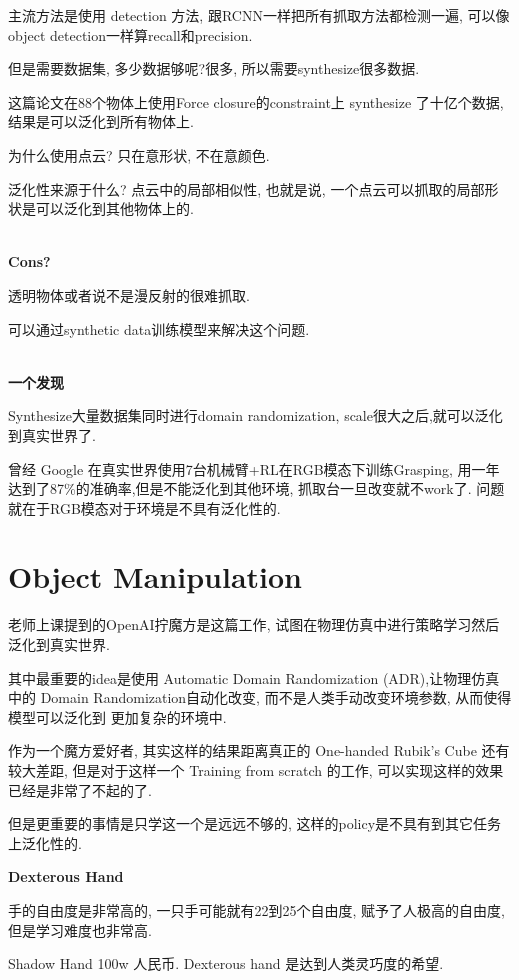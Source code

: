主流方法是使用 detection 方法, 跟RCNN一样把所有抓取方法都检测一遍, 
可以像object detection一样算recall和precision.

但是需要数据集, 多少数据够呢?很多, 所以需要synthesize很多数据.

这篇论文\cite{fang2020graspnet}在88个物体上使用Force closure的constraint上
synthesize 了十亿个数据,结果是可以泛化到所有物体上.

为什么使用点云? 只在意形状, 不在意颜色.

泛化性来源于什么? 点云中的局部相似性, 也就是说, 一个点云可以抓取的局部形状是可以泛化到其他物体上的.

\textbf{\\Cons?}

透明物体或者说不是漫反射的很难抓取.

可以通过synthetic data训练模型来解决这个问题.

\textbf{\\一个发现}

Synthesize大量数据集同时进行domain randomization, scale很大之后,就可以泛化到真实世界了.

曾经 Google 在真实世界使用7台机械臂+RL在RGB模态下训练Grasping, 
用一年达到了87\%的准确率,但是不能泛化到其他环境, 抓取台一旦改变就不work了.
问题就在于RGB模态对于环境是不具有泛化性的.

\section{Object Manipulation}

老师上课提到的OpenAI拧魔方是这篇工作\cite{openai2019solving}, 
试图在物理仿真中进行策略学习然后泛化到真实世界.

其中最重要的idea是使用 Automatic Domain Randomization (ADR),让物理仿真中的
Domain Randomization自动化改变, 而不是人类手动改变环境参数, 从而使得模型可以泛化到
更加复杂的环境中.

作为一个魔方爱好者, 其实这样的结果距离真正的 One-handed Rubik's Cube
还有较大差距, 但是对于这样一个 Training from scratch 的工作, 可以实现这样的效果已经是非常了不起的了.

但是更重要的事情是只学这一个是远远不够的, 这样的policy是不具有到其它任务上泛化性的.

\textbf{Dexterous Hand}

手的自由度是非常高的, 一只手可能就有22到25个自由度, 赋予了人极高的自由度, 但是学习难度也非常高.

Shadow Hand 100w 人民币. Dexterous hand 是达到人类灵巧度的希望.

